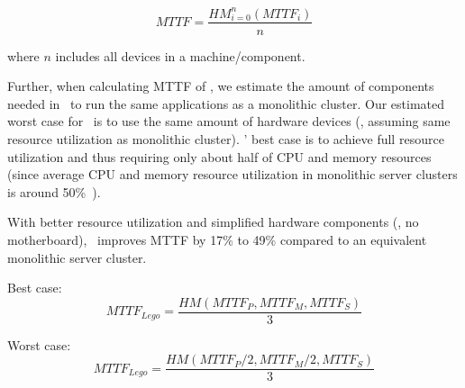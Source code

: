 \vspace{-0.05in}

\begin{small}
\begin{equation}
MTTF = \frac{HM_{i=0}^n(MTTF_i)}{n}
\end{equation}
\end{small}

\vspace{-0.05in}

\noindent where $n$ includes all devices in a machine/component. 

Further, when calculating MTTF of \lego, we estimate the amount of components needed in \lego\ 
to run the same applications as a monolithic cluster.
Our estimated worst case for \lego\ is to use the same amount of hardware devices 
(\ie, assuming same resource utilization as monolithic cluster).
\lego' best case is to achieve full resource utilization 
and thus requiring only about half of CPU and memory resources 
(since average CPU and memory resource utilization in monolithic server clusters is around 50\%~\cite{GoogleTrace,AliTrace}).

With better resource utilization and simplified hardware components (\eg, no motherboard),
\lego\ improves MTTF by 17\% to 49\% compared to an equivalent monolithic server cluster.

Best case:
\begin{equation}
MTTF_{Lego} = \frac{HM(MTTF_P, MTTF_M, MTTF_S)}{3}
\end{equation}

Worst case:
\begin{equation}
MTTF_{Lego} = \frac{HM(MTTF_P/2, MTTF_M/2, MTTF_S)}{3}
\end{equation}
\fi

